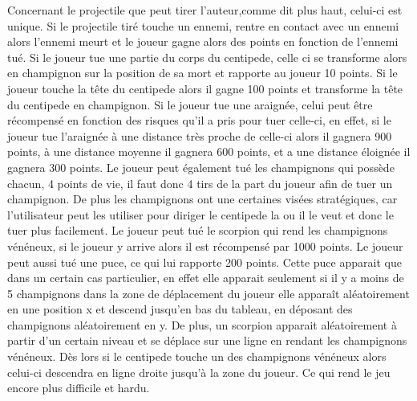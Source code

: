 Concernant le projectile que peut tirer l'auteur,comme dit plus haut, celui-ci est unique. Si le projectile tiré touche un ennemi, rentre en contact avec un ennemi alors l'ennemi meurt et le joueur gagne alors des points en fonction de l'ennemi tué. Si le joueur tue une partie du corps du centipede, celle ci se transforme alors en champignon sur la position de sa mort et rapporte au joueur 10 points. Si le joueur touche la tête du centipede alors il gagne 100 points et transforme la tête du centipede en champignon. Si le joueur tue une araignée, celui peut être récompensé en fonction des risques qu'il a pris pour tuer celle-ci, en effet, si le joueur tue l'araignée à une distance très proche de celle-ci alors il gagnera 900 points, à une distance moyenne il gagnera 600 points, et a une distance éloignée il gagnera 300 points. Le joueur peut également tué les champignons qui possède chacun, 4 points de vie, il faut donc 4 tirs de la part du joueur afin de tuer un champignon. De plus les champignons ont une certaines visées stratégiques, car l'utilisateur peut les utiliser pour diriger le centipede la ou il le veut et donc le tuer plus facilement. Le joueur peut tué le scorpion qui rend les champignons vénéneux, si le joueur y arrive alors il est récompensé par 1000 points. Le joueur peut aussi tué une puce, ce qui lui rapporte 200 points. Cette puce apparait que dans un certain cas particulier, en effet elle apparait seulement si il y a moins de 5 champignons dans la zone de déplacement du joueur elle apparaît aléatoirement en une position x et  descend jusqu'en bas du tableau, en déposant des champignons aléatoirement en y.  De plus, un scorpion apparait aléatoirement à partir d'un certain niveau et se déplace sur une ligne en rendant les champignons vénéneux. Dès lors si le centipede touche un des champignons vénéneux alors celui-ci descendra en ligne droite jusqu'à la zone du joueur. Ce qui rend le jeu encore plus difficile et hardu.


